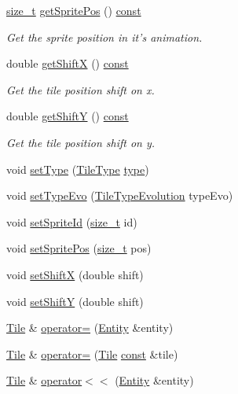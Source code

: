 \begin{DoxyCompactItemize}
\hyperlink{nc__alloc_8h_a7b60c5629e55e8ec87a4547dd4abced4}{size\-\_\-t} \hyperlink{classarcade_1_1_tile_ae50881d237ce87d6d07e36b8e465e4c3}{get\-Sprite\-Pos} () \hyperlink{term__entry_8h_a57bd63ce7f9a353488880e3de6692d5a}{const} 
\begin{DoxyCompactList}\small\item\em Get the sprite position in it's animation. \end{DoxyCompactList}\item 
double \hyperlink{classarcade_1_1_tile_a801efba62fbc37558992fbe30b94f3f1}{get\-Shift\-X} () \hyperlink{term__entry_8h_a57bd63ce7f9a353488880e3de6692d5a}{const} 
\begin{DoxyCompactList}\small\item\em Get the tile position shift on x. \end{DoxyCompactList}\item 
double \hyperlink{classarcade_1_1_tile_a7dad12cd10b4a89a3754b0db4dbc0cf1}{get\-Shift\-Y} () \hyperlink{term__entry_8h_a57bd63ce7f9a353488880e3de6692d5a}{const} 
\begin{DoxyCompactList}\small\item\em Get the tile position shift on y. \end{DoxyCompactList}\item 
void \hyperlink{classarcade_1_1_tile_aefde0ece0a81584556ad5fdb17bb08a4}{set\-Type} (\hyperlink{namespacearcade_a61ba576694ea309cdf2b4b66902408ca}{Tile\-Type} \hyperlink{_entity_8cpp_aa209819775142a76b8e49319d79ecab2}{type})
\item 
void \hyperlink{classarcade_1_1_tile_afc58836782a8b5436b46f28afd6bd171}{set\-Type\-Evo} (\hyperlink{namespacearcade_a2e0a64a64203f78c9efb84a1475a8cf4}{Tile\-Type\-Evolution} type\-Evo)
\item 
void \hyperlink{classarcade_1_1_tile_a92b2fb3cf340193f8309922ca3dfbc82}{set\-Sprite\-Id} (\hyperlink{nc__alloc_8h_a7b60c5629e55e8ec87a4547dd4abced4}{size\-\_\-t} id)
\item 
void \hyperlink{classarcade_1_1_tile_a155bb58d04cfebb632cec14aa22c8b6d}{set\-Sprite\-Pos} (\hyperlink{nc__alloc_8h_a7b60c5629e55e8ec87a4547dd4abced4}{size\-\_\-t} pos)
\item 
void \hyperlink{classarcade_1_1_tile_a1f7ee0701e4625c54bcdc361e76d11cd}{set\-Shift\-X} (double shift)
\item 
void \hyperlink{classarcade_1_1_tile_ae345cf2965c81cd7d3b882e8adf94568}{set\-Shift\-Y} (double shift)
\item 
\hyperlink{classarcade_1_1_tile}{Tile} \& \hyperlink{classarcade_1_1_tile_a0d91a41444ac3ef906e641d7dc8f02ac}{operator=} (\hyperlink{classarcade_1_1_entity}{Entity} \&entity)
\item 
\hyperlink{classarcade_1_1_tile}{Tile} \& \hyperlink{classarcade_1_1_tile_a0b6119379038e88cdbbe1645870df26f}{operator=} (\hyperlink{classarcade_1_1_tile}{Tile} \hyperlink{term__entry_8h_a57bd63ce7f9a353488880e3de6692d5a}{const} \&tile)
\item 
\hyperlink{classarcade_1_1_tile}{Tile} \& \hyperlink{classarcade_1_1_tile_a3d24d5422d32454f0eac84acba7e9df2}{operator$<$$<$} (\hyperlink{classarcade_1_1_entity}{Entity} \&entity)
\end{DoxyCompactItemize}


